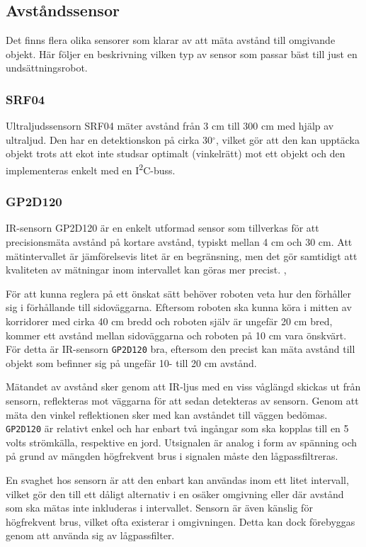 \documentclass[11pt]{article}
\begin{document}
\begin{flushleft}
\subsection{Avståndssensor}
Det finns flera olika sensorer som klarar av att mäta avstånd till omgivande objekt. Här följer en beskrivning vilken typ av sensor som passar bäst till just en undsättningsrobot. 

\subsubsection{SRF04} %
Ultraljudssensorn SRF04 mäter avstånd från 3 cm till 300 cm med hjälp av ultraljud. Den har en detektionskon på cirka 30$^{\circ}$, vilket gör att den kan upptäcka objekt trots att ekot inte studsar optimalt (vinkelrätt) mot ett objekt och den implementeras enkelt med en I\textsuperscript{2}C-buss. \cite{Devantech}

\subsubsection{GP2D120} %
IR-sensorn GP2D120 är en enkelt utformad sensor som tillverkas för att precisionsmäta avstånd på kortare avstånd, typiskt mellan 4 cm och 30 cm. Att mätintervallet är jämförelsevis litet är en begränsning, men det gör samtidigt att kvaliteten av mätningar inom intervallet kan göras mer precist. \cite{website:cmu}, \cite{Sharp}

För att kunna reglera på ett önskat sätt behöver roboten veta hur den förhåller sig i förhållande till sidoväggarna. Eftersom roboten ska kunna köra i mitten av korridorer med cirka 40 cm bredd och roboten själv är ungefär 20 cm bred, kommer ett avstånd mellan sidoväggarna och roboten på 10 cm vara önskvärt. För detta är IR-sensorn \verb+GP2D120+ bra, eftersom den precist kan mäta avstånd till objekt som befinner sig på ungefär 10- till 20 cm avstånd.

Mätandet av avstånd sker genom att IR-ljus med en viss våglängd skickas ut från sensorn, reflekteras mot väggarna för att sedan detekteras av sensorn. Genom att mäta den vinkel reflektionen sker med kan avståndet till väggen bedömas. \verb+GP2D120+ är relativt enkel och har enbart två ingångar som ska kopplas till en 5 volts strömkälla, respektive en jord.  Utsignalen är analog i form av spänning och på grund av mängden högfrekvent brus i signalen måste den lågpassfiltreras. \cite{Sharp}

En svaghet hos sensorn är att den enbart kan användas inom ett litet intervall, vilket gör den till ett dåligt alternativ i en osäker omgivning eller där avstånd som ska mätas inte inkluderas i intervallet. Sensorn är även känslig för högfrekvent brus, vilket ofta existerar i omgivningen. Detta kan dock förebyggas genom att använda sig av lågpassfilter. \cite{Sharp}


\end{flushleft}
\end{document}
